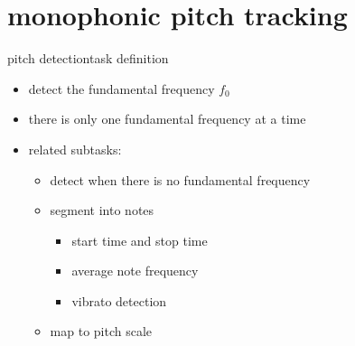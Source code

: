     \section[mono f0]{monophonic pitch tracking}
        \begin{frame}{pitch detection}{task definition}
            \begin{itemize}
                \item   detect the fundamental frequency $f_0$
                \item   there is only one fundamental frequency at a time
                \bigskip
                \item   related subtasks:
                    \begin{itemize}
                        \item   detect when there is no fundamental frequency
                        \item   segment into notes
                            \begin{itemize}
                                \item   start time and stop time
                                \item   average note frequency
                                \item   vibrato detection
                            \end{itemize}
                        \item   map to pitch scale
                    \end{itemize}
            \end{itemize}
        \end{frame}

